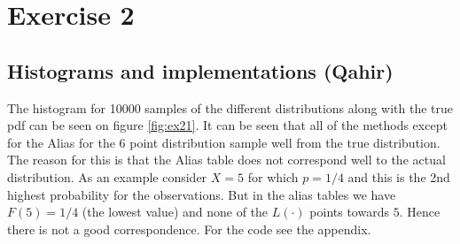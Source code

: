 \newpage
\section*{Exercise 2 }

\subsection*{Histograms and implementations (Qahir)}
The histogram for 10000 samples of the different distributions along with the true pdf can be seen on figure \ref{fig:ex21}. It can be seen that all of the methods except for the Alias for the 6 point distribution sample well from the true distribution. The reason for this is that the Alias table does not correspond well to the actual distribution. As an example consider $X=5$ for which $p=1/4$ and this is the 2nd highest probability for the observations. But in the alias tables we have $F(5)=1/4$ (the lowest value) and none of the $L(\cdot)$ points towards $5$. Hence there is not a good correspondence. For the code see the appendix. 


